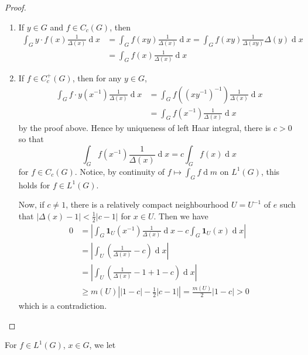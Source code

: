 \documentclass[11pt, a4paper]{memoir}
\theoremstyle{change}
\theoremstyle{plain}
\theoremstyle{nonumberplain}
\newtheorem{proof}{Proof}
\renewcommand{\d}[1]{\ensuremath{\operatorname{d}\!{#1}}}
\newcommand{\idc}[1]{\ensuremath{\mathbf{1}_{#1}}}
\numberwithin{equation}{section}
\begin{document}
\begin{proof}
    \begin{enumerate}[nl,r]
        \item If $y\in G$ and $f\in C_c(G)$, then
            \begin{align*}
                \int_G y\cdot f(x)\frac{1}{\Delta(x)}\d{x}&=\int_G f(xy)\frac{1}{\Delta(x)}\d{x}=\int_G f(xy)\frac{1}{\Delta(xy)}\Delta(y)\d{x}\\
                                                          &= \int_G f(x)\frac{1}{\Delta(x)}\d{x}
            \end{align*}
        \item If $f\in C_c^+(G)$, then for any $y\in G$,
            \begin{align*}
                \int_G f\cdot y(x^{-1})\frac{1}{\Delta(x)}\d{x} &= \int_G f((xy^{-1})^{-1})\frac{1}{\Delta(x)}\d{x}\\
                                                                &= \int_G f(x^{-1})\frac{1}{\Delta(x)}\d{x}
            \end{align*}
            by the proof above.
            Hence by uniqueness of left Haar integral, there is $c>0$ so that
            \begin{equation*}
                \int_G f(x^{-1})\frac{1}{\Delta(x)}\d{x}=c\int_G f(x)\d{x}
            \end{equation*}
            for $f\in C_c(G)$.
            Notice, by continuity of $f\mapsto\int_G f\d{m}$ on $L^1(G)$, this holds for $f\in L^1(G)$.

            Now, if $c\neq 1$, there is a relatively compact neighbourhood $U=U^{-1}$ of $e$ such that $|\Delta(x)-1|<\frac{1}{2}|c-1|$ for $x\in U$.
            Then we have
            \begin{align*}
                0 &= \left\lvert\int_G\idc{U}(x^{-1})\frac{1}{\Delta(x)}\d{x}-c\int_G\idc{U}(x)\d{x}\right\rvert\\
                  &= \left\lvert\int_U\left(\frac{1}{\Delta(x)}-c\right)\d{x}\right\rvert\\
                  &= \left\lvert\int_U\left(\frac{1}{\Delta(x)}-1+1-c\right)\d{x}\right\rvert\\
                  &\geq m(U)\left\lvert|1-c|-\frac{1}{2}|c-1|\right\rvert=\frac{m(U)}{2}|1-c|>0
            \end{align*}
            which is a contradiction.
    \end{enumerate}
\end{proof}
For $f\in L^1(G)$, $x\in G$, we let
\end{document}
